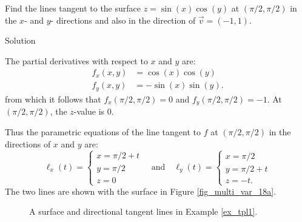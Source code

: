 \begin{example}\label{ex_tpl1}
Find the lines tangent to the surface $z=\sin (x)\cos(y)$ at $(\pi/2,\pi/2)$ in the $x$- and $y$- directions and also in the direction of $\vec v = \left( -1,1\right).$

Solution 

The partial derivatives with respect to $x$ and $y$ are:
\begin{align*}
f_x(x,y) &= \cos(x)\cos(y)\\
f_y(x,y) &= -\sin(x)\sin(y) .
\end{align*}
from which it follows that $f_x(\pi/2,\pi/2) = 0$ and $f_y(\pi/2,\pi/2)=-1$. At $(\pi/2,\pi/2)$, the $z$-value is 0.

Thus the parametric equations of the line tangent to $f$ at $(\pi/2,\pi/2)$ in the directions of $x$  and $y$ are:
$$\ell_x(t) = \left\{\begin{array}{l} x=\pi/2 + t\\ y=\pi/2 \\z=0 \end{array}\right. \quad \text{and}\quad 
\ell_y(t) = \left\{\begin{array}{l} x=\pi/2 \\ y=\pi/2+t \\z=-t. \end{array}\right.$$
The two lines are shown with the surface in Figure \ref{fig_multi_var_18a}.

\begin{figure}[H]
\centering
\qquad
{}
\caption{A surface and directional tangent lines in Example \ref{ex_tpl1}.}
\end{figure}


\end{example}
